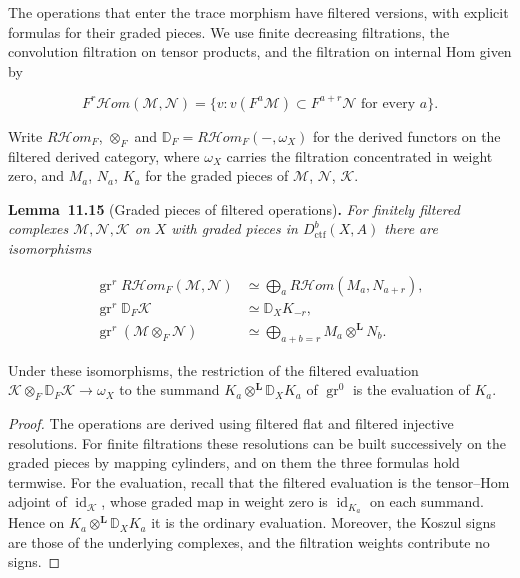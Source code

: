 \documentclass[11pt]{article}
\newenvironment{bpstatement}[2]{\par\addvspace{0.6\baselineskip}\noindent\textbf{#1}#2\textbf{.}\enspace\ignorespaces}
  {\par\addvspace{0.4\baselineskip}}
\newenvironment{bpstatementit}[2]{\begin{bpstatement}{#1}{#2}\itshape\ignorespaces}{\end{bpstatement}}
\providecommand{\cHom}{}\renewcommand{\cHom}{R\mathcal{H}\!om}
\begin{document}
The operations that enter the trace morphism have filtered versions, with explicit formulas for their graded pieces. We use finite decreasing filtrations, the convolution filtration on tensor products, and the filtration on internal Hom given by

\[
F^r\mathcal Hom(\mathcal M,\mathcal N)
=\{v:v(F^a\mathcal M)\subset F^{a+r}\mathcal N
\text{ for every }a\}.
\]

Write \(\cHom_F\), \(\otimes_F\) and \(\mathbb D_F=\cHom_F(-,\omega_X)\) for the derived functors on the filtered derived category, where \(\omega_X\) carries the filtration concentrated in weight zero, and \(M_a\), \(N_a\), \(K_a\) for the graded pieces of \(\mathcal M\), \(\mathcal N\), \(\mathcal K\).

\label{bp211}%
\begin{bpstatementit}{Lemma~11.15}{ (Graded pieces of filtered operations)}
For finitely filtered complexes \(\mathcal M,\mathcal N,\mathcal K\) on \(X\) with graded pieces in \(D^b_{\mathrm{ctf}}(X,A)\) there are isomorphisms

\[
\begin{aligned}
\operatorname{gr}^r\cHom_F(\mathcal M,\mathcal N)
&\simeq\bigoplus_a\cHom(M_a,N_{a+r}),\\
\operatorname{gr}^r\mathbb D_F\mathcal K&\simeq \mathbb D_XK_{-r},\\
\operatorname{gr}^r(\mathcal M\otimes_F\mathcal N)
&\simeq\bigoplus_{a+b=r}M_a\otimes^{\mathbf L} N_b.
\end{aligned}
\]

Under these isomorphisms, the restriction of the filtered evaluation \(\mathcal K\otimes_F\mathbb D_F\mathcal K\to\omega_X\) to the summand \(K_a\otimes^{\mathbf L}\mathbb D_XK_a\) of \(\operatorname{gr}^0\) is the evaluation of \(K_a\).
\end{bpstatementit}

\begin{proof}[{Proof}]\label{bp212}%
The operations are derived using filtered flat and filtered injective resolutions. For finite filtrations these resolutions can be built successively on the graded pieces by mapping cylinders, and on them the three formulas hold termwise. For the evaluation, recall that the filtered evaluation is the tensor–Hom adjoint of \(\operatorname{id}_{\mathcal K}\), whose graded map in weight zero is \(\operatorname{id}_{K_a}\) on each summand. Hence on \(K_a\otimes^{\mathbf L}\mathbb D_XK_a\) it is the ordinary evaluation. Moreover, the Koszul signs are those of the underlying complexes, and the filtration weights contribute no signs.
\end{proof}
\end{document}
